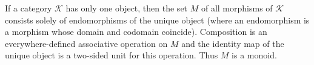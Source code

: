 If a category $\mathcal{K}$ has only one object, then the set $M$ of all morphisms of $\mathcal{K}$ consists solely of endomorphisms of the unique object (where an endomorphism is a morphism whose domain and codomain coincide). Composition is an everywhere-defined associative operation on $M$ and the identity map of the unique object is a two-sided unit for this operation. Thus $M$ is a monoid.
